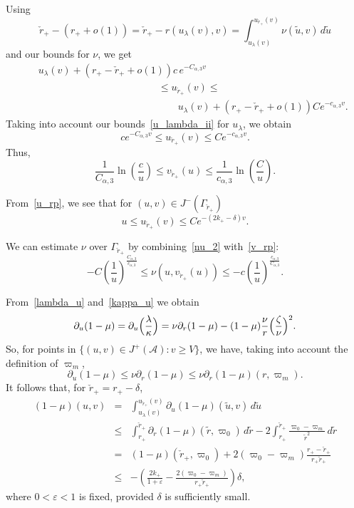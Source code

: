 \documentclass[a4paper,11pt,oneside,reqno]{amsart}
\newcommand{\kk}{k_+}
\newcommand{\cal}{\mathcal}
\newcommand{\eps}{\varepsilon}
\newcommand{\ckrp}{\check r_+}
\newcommand{\ugrp}{u_{\ckrp}}
\newcommand{\vgrp}{v_{\ckrp}}
\begin{document}
Using
$$
\ckrp-(r_++o(1))=\ckrp-r(u_\lambda(v),v)=\int_{u_\lambda(v)}^{\ugrp(v)}\nu(\tilde u,v)\,d\tilde u
$$
and our bounds for $\nu$, we get
\begin{eqnarray*}
&&u_\lambda(v)+(r_+-\ckrp+o(1))c\,e^{-C_{\alpha,3}v}\\
&&\qquad\qquad\qquad\qquad\qquad\qquad\leq\ugrp(v)\leq\\
&&\qquad\qquad\qquad\qquad\qquad\qquad\qquad u_\lambda(v)+(r_+-\ckrp+o(1))Ce^{-c_{\alpha,3}v}.
\end{eqnarray*}
Taking into account our bounds~\eqref{u_lambda_ii} for $u_\lambda$, we obtain
\begin{equation}
\label{u_rp}
ce^{-C_{\alpha,3}v}\leq\ugrp(v)\leq Ce^{-c_{\alpha,3}v}.
\end{equation}
Thus,
\begin{equation}
\label{v_rp}
\frac{1}{C_{\alpha,3}}\ln\left(\frac{c}{u}\right)\leq\vgrp(u)\leq
\frac{1}{c_{\alpha,3}}\ln\left(\frac{C}{u}\right).
\end{equation}

From~\eqref{u_rp}, we see that for $(u,v) \in J^-(\Gamma_{\ckrp})$
\begin{equation}
\label{u_rp_v}
u\leq u_{\ckrp}(v)\leq Ce^{-(2\kk-\delta)v}.
\end{equation}

We can estimate $\nu$ over $\Gamma_{\ckrp}$ by
combining~\eqref{nu_2} with~\eqref{v_rp}:
\begin{equation}
\label{nu_rp}
-C\left(\frac{1}{u}\right)^{\frac{C_{\alpha,3}}{c_{\alpha,3}}}\leq
\nu(u,\vgrp(u))\leq-c\left(\frac{1}{u}\right)^{\frac{c_{\alpha,3}}{C_{\alpha,3}}}.
\end{equation}



From~\eqref{lambda_u} and~\eqref{kappa_u} we obtain
\begin{equation}\label{mu_u}
 \partial_u(1-\mu)=\partial_u\Bigl(\frac\lambda\kappa\Bigr)
 =\nu\partial_r(1-\mu)-(1-\mu)\frac{\nu}{r}\Bigl(\frac\zeta\nu\Bigr)^2.
\end{equation}
So, for points in $\{(u,v)\in J^+({\cal A}): v\geq V\}$, we have, taking into account the definition of $\varpi_m$, 
$$
\partial_u(1-\mu)\leq\nu\partial_r(1-\mu)\leq\nu\partial_r(1-\mu)(r,\varpi_m).
$$
It follows that, for $\ckrp=r_+-\delta$,
\begin{eqnarray}
(1-\mu)(u,v)&=&\int_{u_\lambda(v)}^{\ugrp(v)}\partial_u(1-\mu)(\tilde u,v)\,d\tilde u\nonumber\\
&\leq&\int_{r_+}^{\ckrp}\partial_r(1-\mu)(\tilde r,\varpi_0)\,d\tilde{r}-2\int^{\ckrp}_{r_+}
\frac{\varpi_0-\varpi_m}{\tilde r^2}\,d\tilde r\nonumber\\
&=&(1-\mu)(\ckrp,\varpi_0)+2(\varpi_0-\varpi_m)\frac{r_+-\ckrp}{r_+\ckrp}\nonumber\\ 
&\leq&-\left(\frac{2\kk}{1+\eps}
-\frac{2(\varpi_0-\varpi_m)}{r_+\ckrp}
\right)\delta,\label{negative}
\end{eqnarray}
where $0<\eps<1$ is fixed,
provided $\delta$ is sufficiently small. 
\end{document}
